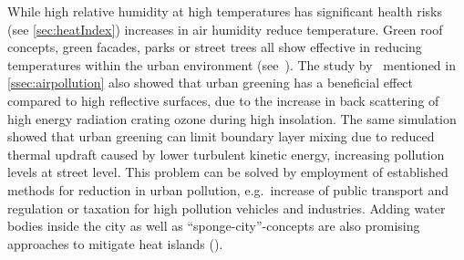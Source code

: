 \documentclass[12pt,a4paper, english,twoside]{scrartcl}
\begin{document}
      While high relative humidity at high temperatures has significant health risks (see \cref{sec:heatIndex}) increases in air humidity reduce temperature. %
      \cite{Olga1993}
      Green roof concepts, green facades, parks or street trees all show effective in reducing temperatures within the urban environment (see~\cite{Ramamurthy2014, Feyisa2014, Dimoudi2003, Gartland2008}).
      The study by~\cite{Fallmann2016} mentioned in \cref{ssec:airpollution} also showed that urban greening has a beneficial effect compared to high reflective surfaces, due to the increase in back scattering of high energy radiation crating ozone during high insolation.
      The same simulation showed that urban greening can limit boundary layer mixing due to reduced thermal updraft caused by lower turbulent kinetic energy, increasing pollution levels at street level.
      This problem can be solved by employment of established methods for reduction in urban pollution, e.g.\ increase of public transport and regulation or taxation for high pollution vehicles and industries. 
      Adding water bodies inside the city as well as ``sponge-city''-concepts are also promising approaches to mitigate heat islands (\cite{He2019}).
\end{document}
